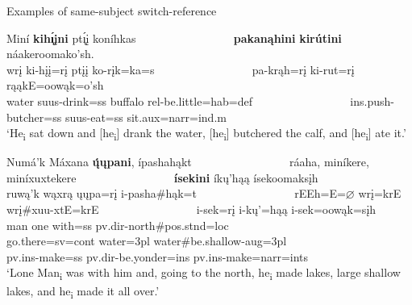 \begin{exe}
    \item\label{Ch5ExSameSubjectSR} Examples of same-subject switch-reference

    \begin{xlist}
        \item\label{Ch5ExSameSubjectSRA} \glll Miní \textbf{kih\'{ı̨}įni} pt\'{ı̨}į koníhkas ~ ~ ~ ~ ~ ~ ~ ~ ~ ~ \textbf{pakanąhini} \textbf{kirútini} náakeroomako'sh.\\
        wrį ki-hįį=rį ptįį ko-rįk=ka=s ~ ~ ~ ~ ~ ~ ~ ~ ~ ~ pa-krąh=rį ki-rut=rį rąąkE=oowąk=o'sh\\
        \textnormal{water} suus-\textnormal{drink}=ss \textnormal{buffalo} rel-\textnormal{be.little}=hab=def ~ ~ ~ ~ ~ ~ ~ ~ ~ ~ ins.push-\textnormal{butcher}=ss suus-\textnormal{eat}=ss \textnormal{sit}.aux=narr=ind.m\\
        \glt `He\textsubscript{i} sat down and [he\textsubscript{i}] drank the water, [he\textsubscript{i}] butchered the calf, and [he\textsubscript{i}] ate it.' \citep[212]{hollow1973a}

        \item\label{Ch5ExSameSubjectSRB} \glll Numá'k Máxana \textbf{ų́ųpani}, ípashahąkt ~ ~ ~ ~ ~ ~ ~ ~ ~ ~ ráaha, miníkere, miníxuxtekere ~ ~ ~ ~ ~ ~ ~ ~ ~ ~ \textbf{ísekini} íkų'hąą ísekoomaksįh\\
        ruwą'k wąxrą ųųpa=rį i-pasha\#hąk=t ~ ~ ~ ~ ~ ~ ~ ~ ~ ~ rEEh=E=$\varnothing$ wrį=krE wrį\#xuu-xtE=krE ~ ~ ~ ~ ~ ~ ~ ~ ~ ~ i-sek=rį i-kų'=hąą i-sek=oowąk=sįh\\
        \textnormal{man} \textnormal{one} \textnormal{with}=ss pv.dir-\textnormal{north}\#pos.stnd=loc ~ ~ ~ ~ ~ ~ ~ ~ ~ ~ \textnormal{go.there}=sv=cont \textnormal{water}=3pl \textnormal{water}\#\textnormal{be.shallow}-aug=3pl ~ ~ ~ ~ ~ ~ ~ ~ ~ ~ pv.ins-\textnormal{make}=ss pv.dir-\textnormal{be.yonder}=ins pv.ins-\textnormal{make}=narr=ints\\
        \glt `Lone Man\textsubscript{i} was with him and, going to the north, he\textsubscript{i} made lakes, large shallow lakes, and he\textsubscript{i} made it all over.' \citep[11]{hollow1973a}


\end{xlist}
\end{exe}
